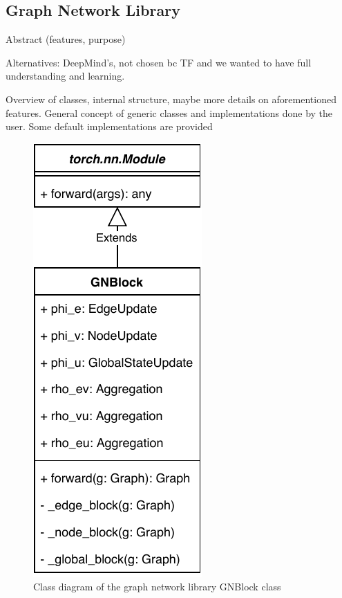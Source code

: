 \subsection{Graph Network Library}
\label{sec:gnlib}

Abstract (features, purpose)

Alternatives: DeepMind's, not chosen bc TF and we wanted to have full understanding and learning.

Overview of classes, internal structure, maybe more details on aforementioned features. General concept of generic classes and implementations done by the user. Some default implementations are provided

\begin{figure}\centering
    \includegraphics[scale=0.65]{resources/graphnets-block}
    \caption{Class diagram of the graph network library GNBlock class}\label{fig:classdiagramgnblock}
\end{figure}

